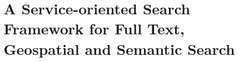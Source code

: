 



\newcommand{\code}[1]{\texttt{#1}}


\newcommand{\searchword}{family-friendly}

\newcommand{\placeholder}{\code{urn:placeholder}}
\newcommand{\placeholderB}{\code{urn:placeholder2}}



%
\lstset{language=Java}
\chapter{A Service-oriented Search Framework for Full Text, Geospatial and Semantic Search}
%
%
%
%
%

